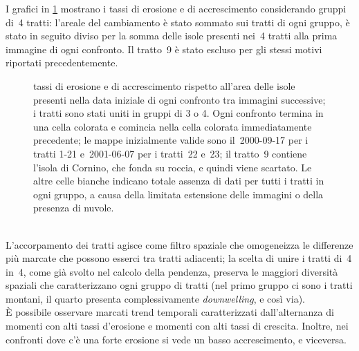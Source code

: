 I grafici in \cref{graph:eros-accr-4tr-matrix} mostrano i tassi di erosione e di accrescimento considerando gruppi di~4 tratti: l'areale del cambiamento è stato sommato sui tratti di ogni gruppo, è stato in seguito diviso per la somma delle isole presenti nei~4 tratti alla prima immagine di ogni confronto.
Il tratto~9 è stato escluso per gli stessi motivi riportati precedentemente.
%
\begin{figure}
	\centering
	
	\caption[tassi di erosione e di accrescimento unendo i tratti 4 a 4]{tassi di erosione e di accrescimento rispetto all'area delle isole presenti nella data iniziale di ogni confronto tra immagini successive; i tratti sono stati uniti in gruppi di 3 o 4.
	Ogni confronto termina in una cella colorata e comincia nella cella colorata immediatamente precedente; le mappe inizialmente valide sono il~2000-09-17 per i tratti 1-21 e~2001-06-07 per i tratti~22 e~23; il tratto~9 contiene l'isola di Cornino, che fonda su roccia, e quindi viene scartato.
	Le altre celle bianche indicano totale assenza di dati per tutti i tratti in ogni gruppo, a causa della limitata estensione delle immagini o della presenza di nuvole.}
	\label{graph:eros-accr-4tr-matrix}
\end{figure}
%
\\
L'accorpamento dei tratti agisce come filtro spaziale che omogeneizza le differenze più marcate che possono esserci tra tratti adiacenti; la scelta di unire i tratti di~4 in~4, come già svolto nel calcolo della pendenza, preserva le maggiori diversità spaziali che caratterizzano ogni gruppo di tratti (nel primo gruppo ci sono i tratti montani, il quarto presenta complessivamente \emph{downwelling}, e così via).
\\
È possibile osservare marcati trend temporali caratterizzati dall'alternanza di momenti con alti tassi d'erosione e momenti con alti tassi di crescita.
Inoltre, nei confronti dove c'è una forte erosione si vede un basso accrescimento, e viceversa.

